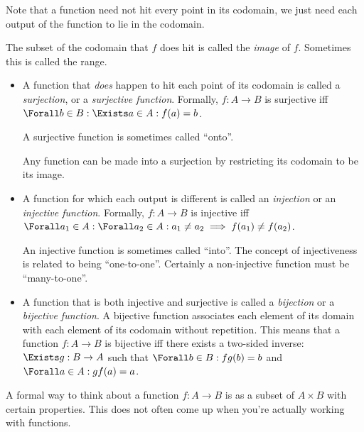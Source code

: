 Note that a function need not hit every point in its codomain, we just need each
output of the function to lie in the codomain.

The subset of the codomain that \(f\) does hit is called the \emph{image} of
\(f\). Sometimes this is called the range.

\begin{itemize}
 \item
  A function that \emph{does} happen to hit each point of its codomain is called
  a \emph{surjection}, or a \emph{surjective function}. Formally, \(f: A \to B\)
  is surjective iff \(\Forall b \in B : \Exists a \in A : f(a) = b\).

  A surjective function is sometimes called ``onto''.

  Any function can be made into a surjection by restricting its codomain to be
  its image.
 \item
  A function for which each output is different is called an \emph{injection} or
  an \emph{injective function}. Formally, \(f: A \to B\) is injective iff
  \(\Forall a_1 \in A : \Forall a_2 \in A : a_1 \ne a_2
    \implies f(a_1) \ne f(a_2)\).

  An injective function is sometimes called ``into''. The concept of
  injectiveness is related to being ``one-to-one''. Certainly a non-injective
  function must be ``many-to-one''.
 \item
  A function that is both injective and surjective is called a \emph{bijection}
  or a \emph{bijective function}. A bijective function associates each element
  of its domain with each element of its codomain without repetition. This means
  that a function \(f: A \to B\) is bijective iff there exists a two-sided
  inverse: \(\Exists g: B \to A\) such that \(\Forall b \in B : fg(b) = b\) and
  \(\Forall a \in A : gf(a) = a\).
\end{itemize}

A formal way to think about a function \(f: A \to B\) is as a subset of
\(A \times B\) with certain properties. This does not often come up when you're
actually working with functions.

